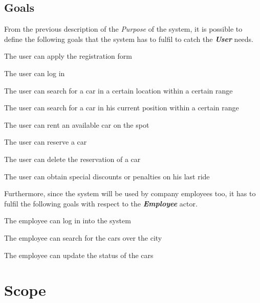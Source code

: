 \documentclass[11pt,a4paper]{report}
\begin{document}
\subsection{Goals}
From the previous description of the \textit{Purpose} of the system, it is possible to define the following goals that the system has to fulfil to catch the \textit{\textbf{User}} needs.
\begin{Goal}
\item {} {The user can apply the registration form}
\item {} {The user can log in}
\item {} {The user can search for a car in a certain location within a certain range}
\item {} {The user can search for a car in his current position within a certain range}
\item {} {The user can rent an available car on the spot}
\item {} {The user can reserve a car}
\item {} {The user can delete the reservation of a car}
\item {} {The user can obtain special discounts or penalties on his last ride}
\end{Goal}
Furthermore, since the system will be used by company employees too, it has to fulfil the following goals with respect to the \textbf{\textit{Employee}} actor. 
\begin{Goal}[resume]
\item {} The employee can log in into the system
\item {} The employee can search for the cars over the city
\item {} The employee can update the status of the cars
\end{Goal}

\section{Scope}
\end{document}
